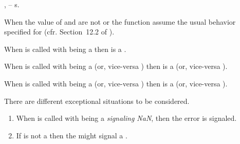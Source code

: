 \documentclass[../Arithmetic-Operations.tex]{subfiles}
\begin{document}

\DSyntax{}

  \RArrow{} 

\DArgsNValues{}

,  -- \CL{} s.

\DDescription{}

When the value of  \code{)} and
 \code{)} are not
 or  the function
 assume the usual behavior specified for \CL{} (cfr.
Section~12.2 of \cite{1996:ANSIHyperSpec}).

When  is called with  being a
 then  is a
.

When  is called with 
\code{)}  being a  (or,
vice-versa ) then 
 \code{)} is a
 (or, vice-versa ).

When  is called with 
\code{)}  being a  (or,
vice-versa ) then 
 \code{)} is a
 (or, vice-versa ).

\DExceptional{}


There are different exceptional situations to be considered.

\begin{enumerate}
\item When  is called with 
   being a \emph{signaling NaN}, then the
   error is signaled.

\item If  is not a \CL{} 
  then the 
  might signal a .
\end{enumerate}

\DSeeAlso{}

\code{-}
\end{document}
